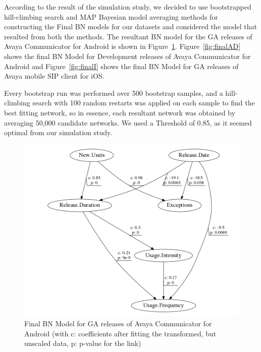 \documentclass[smallextended]{svjour3}       %
\begin{document}
According to the result of the simulation study, we decided to use bootstrapped hill-climbing search and MAP Bayesian model averaging methods for constructing the Final BN models for our datasets and considered the model that resulted from both the methods. 
The resultant BN model for the GA releases of Avaya Communicator for Android is shown in Figure~\ref{fig:finalAGA}.  Figure~\ref{fig:finalAD} shows the final BN Model for Development releases of Avaya Communicator for Android and Figure~\ref{fig:finalI} shows the final BN Model for GA releases of Avaya mobile SIP client for iOS.

Every bootstrap run was performed over 500 bootstrap samples, and a
hill-climbing search  with 100 random restarts was applied on each sample 
to find the best fitting network, so in essence, each resultant network was 
obtained by averaging 50,000 candidate networks. We used a Threshold of 0.85, as it seemed optimal from our simulation study.

\begin{figure}[!t]
\centering
\includegraphics[width=\linewidth]{AGA}%
\caption{Final BN Model for GA releases of Avaya Communicator for Android (with c: coefficients after fitting the transformed, but unscaled data, p: p-value  for the link) }
\label{fig:finalAGA}
\end{figure}
\end{document}
